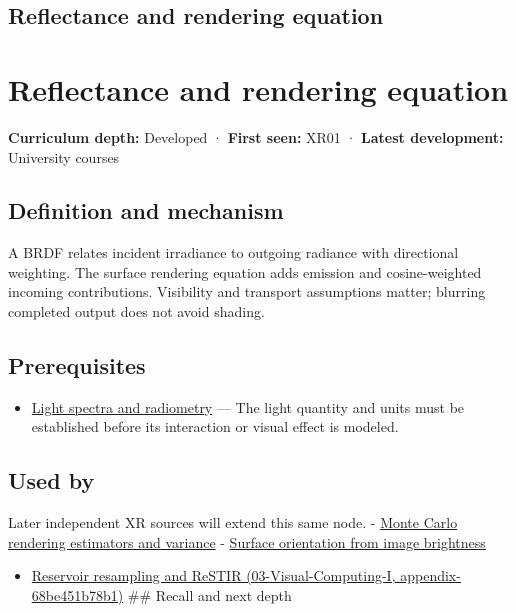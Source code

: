 \hypertarget{appendix-96da0b153b77}{}
\section*{Reflectance and rendering equation}
\chapter{Reflectance and rendering equation}\label{appendix-96da0b153b77-reflectance-and-rendering-equation}

\textbf{Curriculum depth:} Developed · \textbf{First seen:} XR01 · \textbf{Latest development:} University courses

\section{Definition and mechanism}\label{appendix-96da0b153b77-definition-and-mechanism}

A BRDF relates incident irradiance to outgoing radiance with directional weighting. The surface rendering equation adds emission and cosine-weighted incoming contributions. Visibility and transport assumptions matter; blurring completed output does not avoid shading.

\section{Prerequisites}\label{appendix-96da0b153b77-prerequisites}

\begin{itemize}
\tightlist
\item
  \hyperref[appendix-215c2570199b]{Light spectra and radiometry} --- The light quantity and units must be established before its interaction or visual effect is modeled.
\end{itemize}

\section{Used by}\label{appendix-96da0b153b77-used-by}

Later independent XR sources will extend this same node. - \hyperref[appendix-031e02bf28af]{Monte Carlo rendering estimators and variance} - \hyperref[appendix-89b2d5b7c9e1]{Surface orientation from image brightness}

\begin{itemize}
\tightlist
\item
  \href{../03-Visual-Computing-I/main.pdf\#nameddest=appendix-68be451b78b1}{Reservoir resampling and ReSTIR (03-Visual-Computing-I, appendix-68be451b78b1)} \#\# Recall and next depth
\end{itemize}

